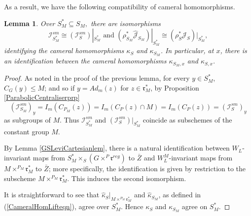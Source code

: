 \documentclass{amsart}
\newtheorem{lemma}[theorem]{Lemma}
\theoremstyle{remark}
\numberwithin{theorem}{section}
\numberwithin{equation}{section}
\begin{document}
As a result, we have the following compatibility of cameral homomorphisms.

\begin{lemma}\label{CameralLIlem}
    Over $S_M^* \subseteq S_M,$ there are isomorphisms $$\mathcal I_{S_M^*}^{sm} \cong (\mathcal I_{S}^{sm})|_{S_M^*} \text{ and } (\rho_{S_M}^*\hat{\mathcal J}_{S_M})|_{S_M^*} \cong (\rho_S^*\hat{\mathcal J}_S)|_{S_M^*},$$ identifying the cameral homomorphisms $\kappa_S$ and $\kappa_{S_M}$. In particular, at $x$, there is an identification between the cameral homomorphisms $\kappa_{S_M,x}$ and $\kappa_{S,x}$.
\end{lemma}

\begin{proof}
As noted in the proof of the previous lemma, for every $y \in S_M^*$, $C_G(y) \leq M$; and so if $y = Ad_m(z)$ for $z \in \mathfrak{r}_M^*$, by Proposition \ref{ParabolicCentraliserprp} $$(\mathcal I_{S_M}^{sm})_y = I_m(C_{P_M}(z)) = I_m(C_P(z) \cap M) = I_m(C_P(z)) =(\mathcal I_S^{sm})_y$$
as subgroups of $M$. Thus $\mathcal I_{S_M^*}^{sm}$ and $ (\mathcal I_{S}^{sm})|_{S_M^*}$ coincide as subschemes of the constant group $M$.

By Lemma \ref{GSLeviCartesianlem}, there is a natural identification between $W_L$-invariant maps from $S_M^* \times_S(G \times^P \mathfrak{r}^{reg})$ to $\bar{Z}$ and $W_L^M$-invariant maps from $M \times^{P_M} \mathfrak{r}_M^*$ to $\bar{Z}$; more specifically, the identification is given by restriction to the subscheme $M \times^{P_M} \mathfrak{r}_M^*$. This induces the second isomorphism.

It is straightforward to see that $\hat{\kappa}_S|_{M \times^{P_M} \mathfrak{r}_M^*}$ and $\hat{\kappa}_{S_M}$, as defined in (\ref{CameralHomLifteqn}), agree over $S_M^*$. Hence $\kappa_S$ and $\kappa_{S_M}$ agree on $S_M^*$.
\end{proof}
\end{document}
